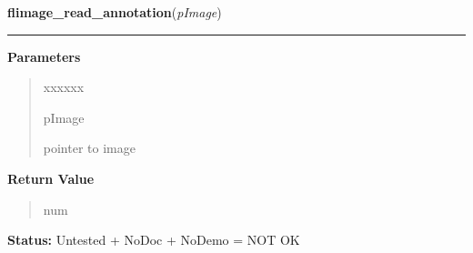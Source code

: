 \hspace{.8\funcindent}\begin{boxedminipage}{\funcwidth}

    \raggedright \textbf{flimage\_read\_annotation}(\textit{pImage})

    \vspace{-1.5ex}

    \rule{\textwidth}{0.5\fboxrule}
\setlength{\parskip}{2ex}
\setlength{\parskip}{1ex}
      \textbf{Parameters}
      \vspace{-1ex}

      \begin{quote}
        \begin{Ventry}{xxxxxx}

          \item[pImage]

          pointer to image

        \end{Ventry}

      \end{quote}

      \textbf{Return Value}
    \vspace{-1ex}

      \begin{quote}
      num

      \end{quote}

\textbf{Status:} Untested + NoDoc + NoDemo = NOT OK



    \end{boxedminipage}

    \label{xformslib:library:flimage_replace_image}

    \vspace{0.5ex}

